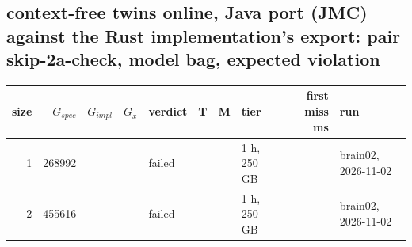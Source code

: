 \documentclass[10pt]{article}
\begin{document}
\subsection*{context-free twins online, Java port (JMC) against the Rust implementation's export: pair \textsf{skip-2a-check}, model bag, expected violation}
\begin{longtable}{@{}rrrrlrrlrl@{}}
\toprule
size & $G_{\mathit{spec}}$ & $G_{\mathit{impl}}$ & $G_x$ & verdict & T & M & tier & first miss ms & run \\
\midrule
\endhead
\color{blue} 1 & 268992 &  &  & failed &  &  & 1 h, 250 GB &  & brain02, 2026-11-02 \\
\color{blue} 2 & 455616 &  &  & failed &  &  & 1 h, 250 GB &  & brain02, 2026-11-02 \\
\bottomrule
\end{longtable}
\end{document}
